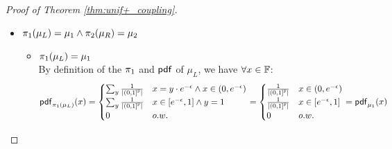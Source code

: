 \documentclass[a4paper,11pt]{article}
\begin{document}
\begin{proof}[Proof of Theorem \ref{thm:unif+_coupling}]
\begin{itemize}
%
	\item $\pi_1(\mu_L) = \mu_1 \land \pi_2(\mu_R) = \mu_2$
	\begin{itemize}
		\item $\pi_1(\mu_L) = \mu_1$ 
		\\
%
		By definition of the $\pi_1$ and $\mathsf{pdf}$ of $\mu_L$, we have $\forall x  \in \mathbb{F}$:
		\[
			\mathsf{pdf}_{\pi_1(\mu_L)}(x) = 
			\begin{cases}
			\sum_{y}\frac{1}{\left \vert (0, 1]^{\mathbb{F}} \right \vert} 
			& x = y \cdot e^{-\epsilon}  \land x \in (0, e^{-\epsilon})\\
			\sum_{y} \frac{1}{\left \vert (0, 1]^{\mathbb{F}} \right \vert} 
			& x \in [e^{-\epsilon}, 1] \land y = 1\\
			0       & o.w.
			\end{cases} 
			= 
			\begin{cases}
			\frac{1}{\left \vert (0, 1]^{\mathbb{F}} \right \vert}
			&  x \in (0, e^{-\epsilon})\\
			\frac{1}{\left \vert (0, 1]^{\mathbb{F}} \right \vert}
			& x \in [e^{-\epsilon}, 1] \\
			0       & o.w.
			\end{cases}
			=
			\mathsf{pdf}_{\mu_1}(x)
		\]


\end{itemize}
\end{itemize}
\end{proof}
\end{document}

